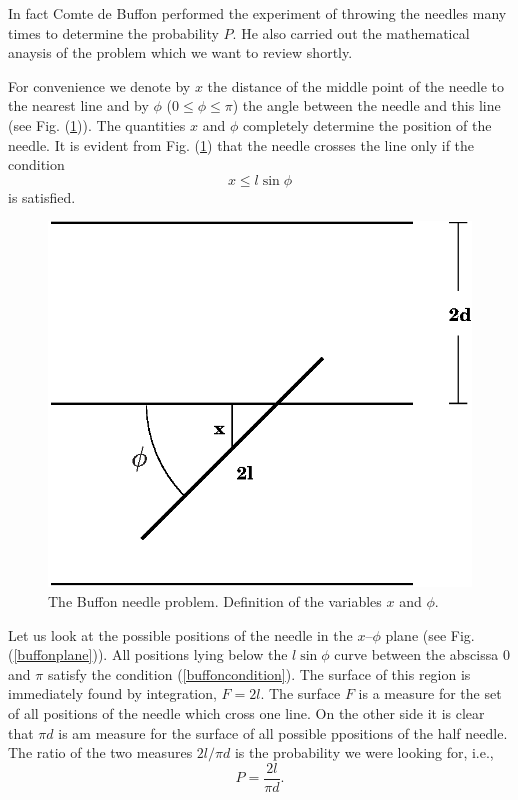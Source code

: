 In fact Comte de Buffon performed the experiment of throwing the
needles many times to determine the probability $P$. He also carried
out the mathematical anaysis of the problem which we want to review
shortly.

For convenience we denote by $x$ the distance of the middle point of
the needle to the nearest line and by $\phi$ ($0 \le \phi \le \pi$) the
angle between the needle and this line (see
Fig. (\ref{buffondefinition})). The quantities $x$ and $\phi$
completely determine the position of the needle. It is evident from
Fig. (\ref{buffondefinition}) that the needle crosses the line only if
the condition
\begin{equation}
\label{buffoncondition}
x \le l \sin \phi
\end{equation}
is satisfied.

\begin{figure}
\label{buffondefinition}
\includegraphics[width=.7\textwidth]{Figures/buffondefinition.eps}
\caption{The Buffon needle problem. Definition of the variables $x$
  and $\phi$.}
\end{figure}

Let us look at the possible positions of the needle in the $x$--$\phi$
plane (see Fig. (\ref{buffonplane})). All positions lying below the
$l\sin \phi$ curve between the abscissa 0 and $\pi$ satisfy the
condition (\ref{buffoncondition}). The surface of this region is
immediately found by integration, $F=2l$. The surface $F$ is a measure
for the set of all positions of the needle which cross one line. On
the other side it is clear that $\pi d$ is am measure for the surface
of all possible ppositions of the half needle. The ratio of the two
measures $ 2l/\pi d$ is the probability we were looking for, i.e.,
\begin{equation}
\label{buffonprobability}
P = \frac{2 l}{\pi d}.
\end{equation}

